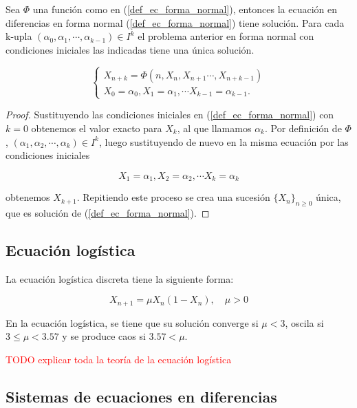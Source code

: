 \begin{theorem}
Sea $\Phi$ una función como en (\ref{def_ec_forma_normal}), entonces la ecuación en diferencias en forma normal (\ref{def_ec_forma_normal}) tiene solución.
Para cada k-upla $(\alpha_0, \alpha_1, \cdots ,\alpha_{k-1})\in I^{k}$ el problema anterior en forma normal con condiciones iniciales las indicadas tiene una única solución.

\begin{equation}
\begin{cases}
X_{n+k} = \Phi (n, X_n, X_{n+1}\cdots , X_{n+k-1}) \\
X_0 = \alpha_0, X_1=\alpha_1, \cdots X_{k-1}=\alpha_{k-1}.
\end {cases}
\end{equation}

\end{theorem}
\begin{proof}
Sustituyendo las condiciones iniciales en (\ref{def_ec_forma_normal}) con $k=0$ obtenemos el valor exacto para $X_k$, al que llamamos $\alpha_k$. Por definición de $\Phi$, $(\alpha_1, \alpha_2, \cdots ,\alpha_{k})\in I^{k}$, luego sustituyendo de nuevo en la misma ecuación por las condiciones iniciales

$$X_1 = \alpha_1, X_2=\alpha_2, \cdots X_{k}=\alpha_{k}$$

obtenemos $X_{k+1}$. Repitiendo este proceso se crea una sucesión $\{X_n\}_{n\geq 0}$ única, que es solución de (\ref{def_ec_forma_normal}).
\end{proof}


\subsection{Ecuación logística}

\begin{definition}
La ecuación logística discreta tiene la siguiente forma:

$$X_{n+1} = \mu X_n(1-X_n),\quad \mu > 0$$
\end{definition}

\begin{proposition}
En la ecuación logística, se tiene que su solución converge si $\mu < 3$, oscila si $3\leq \mu < 3.57$ y se produce caos si $3.57 < \mu$. 
\end{proposition}

\textcolor{red}{TODO explicar toda la teoría de la ecuación logística}

\subsection{Sistemas de ecuaciones en diferencias}

